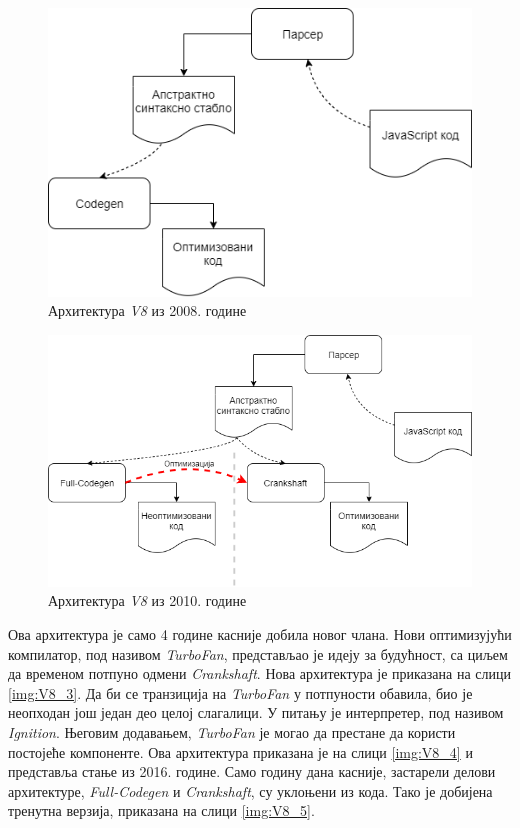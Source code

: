 \documentclass[12pt,oneside]{memoir}
\begin{document}
\begin{figure}
\begin{center}
\includegraphics[scale=0.5]{v8_1}
\caption{Архитектура \textit{V8} из 2008. године}
\label{img:V8_1}
\end{center}
\end{figure}

\begin{figure}
\begin{center}
\includegraphics[scale=0.5]{v8_2}
\caption{Архитектура \textit{V8} из 2010. године}
\label{img:V8_2}
\end{center}
\end{figure}

Ова архитектура је само 4 године касније добила новог члана. Нови оптимизујући компилатор, под називом \textit{TurboFan}, представљао је идеју за будућност, са циљем да временом
потпуно одмени \textit{Crankshaft}. Нова архитектура је приказана на слици \ref{img:V8_3}. Да би се транзиција на \textit{TurboFan} у потпуности обавила, био је неопходан још
један део целој слагалици. У питању је интерпретер, под називом \textit{Ignition}. Његовим додавањем, \textit{TurboFan} је могао да престане да користи постојеће компоненте.
Ова архитектура приказана је на слици \ref{img:V8_4} и представља стање из 2016. године. Само годину дана касније, застарели делови архитектуре, \textit{Full-Codegen} и
\textit{Crankshaft}, су уклоњени из кода. Тако је добијена тренутна верзија, приказана на слици \ref{img:V8_5}.
\end{document}
